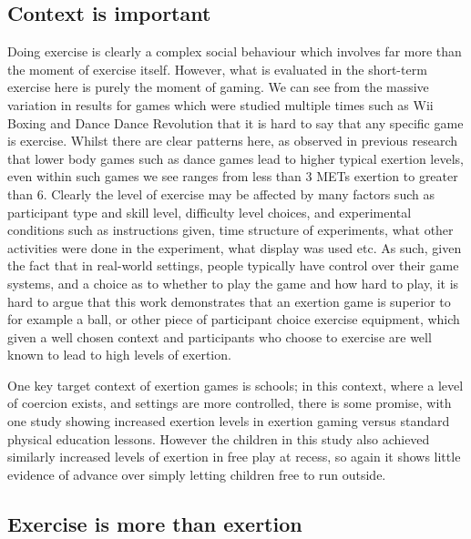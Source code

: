\subsection{Context is important}
Doing exercise is clearly a complex social behaviour which involves far more than the moment of exercise itself. However, what is evaluated in the short-term exercise here is purely the moment of gaming. We can see from the massive variation in results for games which were studied multiple times such as Wii Boxing and Dance Dance Revolution that it is hard to say that any specific game is exercise. Whilst there are clear patterns here, as observed in previous research \cite{Peng_2011} that lower body games such as dance games lead to higher typical exertion levels, even within such games we see ranges from less than 3 METs exertion to greater than 6. Clearly the level of exercise may be affected by many factors such as participant type and skill level, difficulty level choices, and experimental conditions such as instructions given, time structure of experiments, what other activities were done in the experiment, what display was used etc. As such, given the fact that in real-world settings, people typically have control over their game systems, and a choice as to whether to play the game and how hard to play, it is hard to argue that this work demonstrates that an exertion game is superior to for example a ball, or other piece of participant choice exercise equipment, which given a well chosen context and participants who choose to exercise are well known to lead to high levels of exertion. 

One key target context of exertion games is schools; in this context, where a level of coercion exists, and settings are more controlled, there is some promise, with one study \cite{Gao2015AExergaming} showing increased exertion levels in exertion gaming versus standard physical education lessons. However the children in this study also achieved similarly increased levels of exertion in free play at recess, so again it shows little evidence of advance over simply letting children free to run outside.

\subsection{Exercise is more than exertion}

